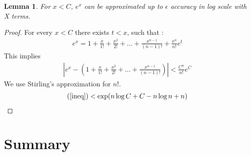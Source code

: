 \documentclass{article}
\newtheorem{lemma}[theorem]{Lemma}
\begin{document}
\begin{lemma}
	For $x < C$, $e^x$ can be approximated up to $\epsilon$ accuracy in log scale with X terms. 
\end{lemma}
\begin{proof}

For every $x < C$ there exists $t < x$, such that :  
\begin{align*}
	e^x = 1 + \frac{x}{1!} + \frac{x^2}{2!} + \dots + \frac{x^{n - 1}}{(n - 1)!} + \frac{x^n}{n!}e^t
\end{align*}
This implies
\begin{align}
	|e^x - (1 + \frac{x}{1!} + \frac{x^2}{2!} + \dots + \frac{x^{n - 1}}{(n - 1)!}) | < \frac{C^n}{n!}e^C 
	\label{ineq}
\end{align}
We use Stirling's approximation for $n!$.
\begin{align}
	(\ref{ineq}) < \exp(n\log{C} + C - n\log{n} + n)
\end{align}



\end{proof}


\section{Summary}
\nocite{*}


\end{document}
